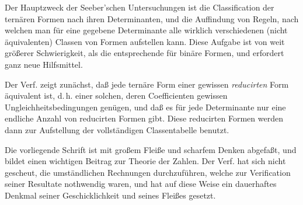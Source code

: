 \documentclass[12pt,a4paper]{article}
\theoremstyle{plain}
\theoremstyle{definition}
\theoremstyle{remark}
\begin{document}
Der Hauptzweck der Seeber'schen Untersuchungen ist die Classification der ternären Formen nach ihren Determinanten, und die Auffindung von Regeln, nach welchen man für eine gegebene Determinante alle wirklich verschiedenen (nicht äquivalenten) Classen von Formen aufstellen kann. Diese Aufgabe ist von weit größerer Schwierigkeit, als die entsprechende für binäre Formen, und erfordert ganz neue Hilfsmittel.

Der Verf. zeigt zunächst, daß jede ternäre Form einer gewissen \textit{reducirten} Form äquivalent ist, d.\,h. einer solchen, deren Coefficienten gewissen Ungleichheitsbedingungen genügen, und daß es für jede Determinante nur eine endliche Anzahl von reducirten Formen gibt. Diese reducirten Formen werden dann zur Aufstellung der vollständigen Classentabelle benutzt.

Die vorliegende Schrift ist mit großem Fleiße und scharfem Denken abgefaßt, und bildet einen wichtigen Beitrag zur Theorie der Zahlen. Der Verf. hat sich nicht gescheut, die umständlichen Rechnungen durchzuführen, welche zur Verification seiner Resultate nothwendig waren, und hat auf diese Weise ein dauerhaftes Denkmal seiner Geschicklichkeit und seines Fleißes gesetzt.
\end{document}
